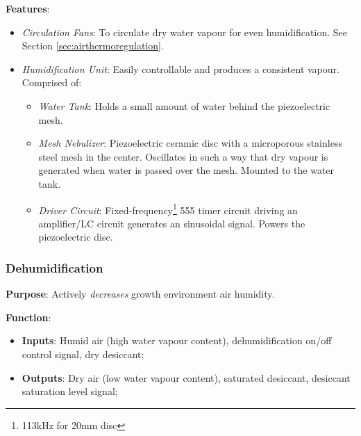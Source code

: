 \textbf{Features}:
\begin{itemize}
    \item \textit{Circulation Fans}: To circulate dry water vapour for even humidification. See Section \ref{sec:airthermoregulation}.
    \item \textit{Humidification Unit}: Easily controllable and produces a consistent vapour. Comprised of:
    \begin{itemize}
        \item \textit{Water Tank}: Holds a small amount of water behind the piezoelectric mesh.
        \item \textit{Mesh Nebulizer}: Piezoelectric ceramic disc with a microporous stainless steel mesh in the center. Oscillates in such a way that dry vapour is generated when water is passed over the mesh. Mounted to the water tank.
        \item \textit{Driver Circuit}: Fixed-frequency\footnote{113kHz for 20mm disc} 555 timer circuit driving an amplifier/LC circuit generates an sinusoidal signal. Powers the piezoelectric disc.
    \end{itemize}
\end{itemize}

\subsubsection{Dehumidification}
\label{sec:dehumidification}

\textbf{Purpose}: Actively \textit{decreases} growth environment air humidity.

\textbf{Function}:
\begin{itemize}
    \item \textbf{Inputs}: Humid air (high water vapour content), dehumidification on/off control signal, dry desiccant;
    \item \textbf{Outputs}: Dry air (low water vapour content), saturated desiccant, desiccant saturation level signal;
\end{itemize}

